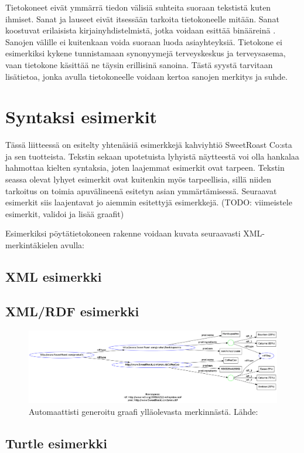 \documentclass[finnish, 12pt, a4paper, elec, utf8, pdfa, online]{aaltothesis}
\begin{document}
Tietokoneet eivät ymmärrä tiedon välisiä suhteita suoraan tekstistä kuten ihmiset. Sanat ja lauseet eivät itsessään tarkoita tietokoneelle mitään. Sanat koostuvat erilaisista kirjainyhdistelmistä, jotka voidaan esittää binääreinä \cite{ASCII}. Sanojen välille ei kuitenkaan voida suoraan luoda asiayhteyksiä. Tietokone ei esimerkiksi kykene tunnistamaan synonyymejä terveyskeskus ja terveysasema, vaan tietokone käsittää ne täysin erillisinä sanoina. Tästä syystä tarvitaan lisätietoa, jonka avulla tietokoneelle voidaan kertoa sanojen merkitys ja suhde.

\clearpage


\clearpage
\thesisappendix

\section{Syntaksi esimerkit\label{LiiteA}}

Tässä liitteessä on esitelty yhtenäisiä esimerkkejä kahviyhtiö SweetRoast Co:sta ja sen tuotteista. Tekstin sekaan upotetuista lyhyistä näytteestä voi olla hankalaa hahmottaa kielten syntaksia, joten laajemmat esimerkit ovat tarpeen. Tekstin seassa olevat lyhyet esimerkit ovat kuitenkin myös tarpeellisia, sillä niiden tarkoitus on toimia apuvälineenä esitetyn asian ymmärtämisessä. Seuraavat esimerkit siis laajentavat jo aiemmin esitettyjä esimerkkejä. (TODO: viimeistele esimerkit, validoi ja lisää graafit)

Esimerkiksi pöytätietokoneen rakenne voidaan kuvata seuraavasti XML-merkintäkielen avulla:
\subsection{XML esimerkki}

\vskip 0.75cm

\subsection{XML/RDF esimerkki}


\begin{figure}[htb]
\centering
\includegraphics[width=15cm]{images/xml-rdf-seco.png}
\caption{Automaattisti generoitu graafi ylläolevasta merkinnästä. Lähde:\cite{SeCo_RDF_validator} \label{images/xml-rdf-seco.png}}
\end{figure}
\vskip 0.75cm
\clearpage

\subsection{Turtle esimerkki}

\vskip 0.75cm
\end{document}
